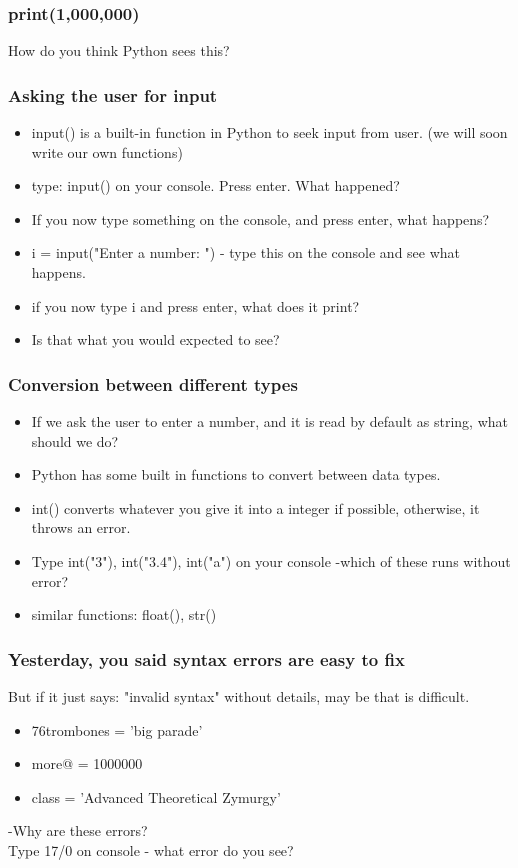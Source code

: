 \documentclass{beamer}
\begin{document}
\begin{frame}
\frametitle{print(1,000,000)}
\centering
How do you think Python sees this?
\end{frame}

\begin{frame}
\frametitle{Asking the user for input}
\begin{itemize}
\item input() is a built-in function in Python to seek input from user. (we will soon write our own functions)
\item type: input() on your console. Press enter. What happened? \pause
\item If you now type something on the console, and press enter, what happens? \pause
\item i = input("Enter a number: ") - type this on the console and see what happens. \pause
\item if you now type i and press enter, what does it print?
\item Is that what you would expected to see?
\end{itemize}
\end{frame}

\begin{frame}
\frametitle{Conversion between different types}
\begin{itemize}
\item If we ask the user to enter a number, and it is read by default as string, what should we do? 
\item Python has some built in functions to convert between data types.
\item int() converts whatever you give it into a integer if possible, otherwise, it throws an error.
\item Type int("3"), int("3.4"), int("a") on your console -which of these runs without error? \pause
\item similar functions: float(), str()
\end{itemize}
\end{frame}

\begin{frame}
\frametitle{Yesterday, you said syntax errors are easy to fix}
But if it just says: "invalid syntax" without details, may be that is difficult. 
\begin{itemize}
\item 76trombones = 'big parade'
\item more@ = 1000000
\item class = 'Advanced Theoretical Zymurgy'
\end{itemize}
-Why are these errors?
 \pause
\\ Type 17/0 on console - what error do you see?
\end{frame}
\end{document}
